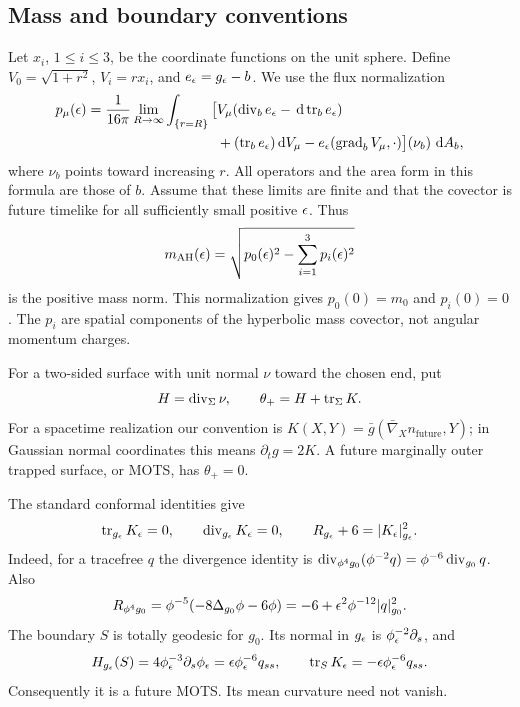 \subsection{Mass and boundary conventions}

Let $x_i$, $1\leq i\leq3$, be the coordinate functions on the unit
sphere. Define $V_0=\sqrt{1+r^2}$, $V_i=rx_i$, and
$e_\epsilon=g_\epsilon-b$. We use the flux normalization
\begin{equation}\label{ads:eq:mass-flux}
\begin{split}
 p_\mu(\epsilon)=\frac1{16\pi}\lim_{R\to\infty}
 \int_{\{r=R\}}\big[
 &V_\mu(\operatorname{div}_b e_\epsilon-\,\mathrm d\operatorname{tr}_b e_\epsilon)\\
 &+(\operatorname{tr}_b e_\epsilon)\,\mathrm d V_\mu
      -e_\epsilon(\operatorname{grad}_bV_\mu,\cdot)
 \big](\nu_b)\,\,\mathrm d A_b ,
\end{split}
\end{equation}
where $\nu_b$ points toward increasing $r$. All operators and the
area form in this formula are those of $b$. Assume that these
limits are finite and that the covector is future timelike for
all sufficiently small positive $\epsilon$. Thus
\[
 m_{\mathrm{AH}}(\epsilon)=\sqrt{p_0(\epsilon)^2-\sum_{i=1}^3p_i(\epsilon)^2}
\]
is the positive mass norm. This normalization gives $p_0(0)=m_0$
and $p_i(0)=0$. The $p_i$ are spatial components of the hyperbolic
mass covector, not angular momentum charges.

For a two-sided surface with unit normal $\nu$ toward the chosen
end, put
\[
 H=\operatorname{div}_\Sigma\nu,\qquad
 \theta_+=H+\operatorname{tr}_\Sigma K.
\]
For a spacetime realization our convention is
$K(X,Y)=\bar g(\bar\nabla_Xn_{\mathrm{future}},Y)$;
in Gaussian normal coordinates this means $\partial_tg=2K$.
A future marginally outer trapped surface, or MOTS, has
$\theta_+=0$.

The standard conformal identities give
\begin{equation}\label{ads:eq:constraints}
 \operatorname{tr}_{g_\epsilon}K_\epsilon=0,\qquad
 \operatorname{div}_{g_\epsilon}K_\epsilon=0,\qquad
 R_{g_\epsilon}+6=|K_\epsilon|_{g_\epsilon}^2.
\end{equation}
Indeed, for a tracefree $q$ the divergence identity is
$\operatorname{div}_{\phi^4g_0}(\phi^{-2}q)=\phi^{-6}\operatorname{div}_{g_0}q$.
Also
\[
 R_{\phi^4g_0}
 =\phi^{-5}(-8\Delta_{g_0}\phi-6\phi)
 =-6+\epsilon^2\phi^{-12}|q|_{g_0}^2.
\]
The boundary $S$ is totally geodesic for $g_0$.
Its normal in $g_\epsilon$ is $\phi_\epsilon^{-2}\partial_s$, and
\begin{equation}\label{ads:eq:boundary-mots}
 H_{g_\epsilon}(S)=4\phi_\epsilon^{-3}\partial_s\phi_\epsilon
       =\epsilon\phi_\epsilon^{-6}q_{ss},\qquad
 \operatorname{tr}_SK_\epsilon=-\epsilon\phi_\epsilon^{-6}q_{ss}.
\end{equation}
Consequently it is a future MOTS. Its mean curvature need not vanish.

